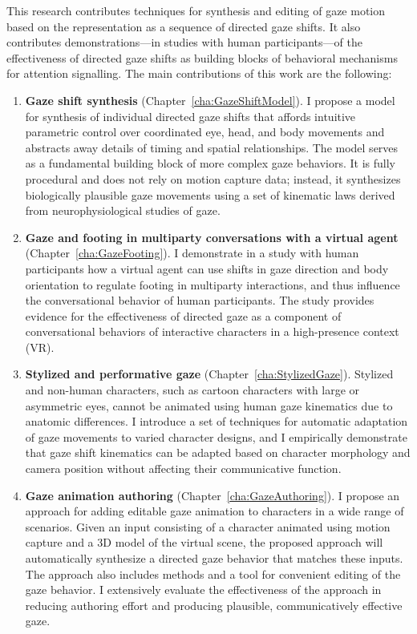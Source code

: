 This research contributes techniques for synthesis and editing of gaze motion based on the representation as a sequence of directed gaze shifts. It also contributes demonstrations---in studies with human participants---of the effectiveness of directed gaze shifts as building blocks of behavioral mechanisms for attention signalling. The main contributions of this work are the following:

\begin{enumerate}
\item \textbf{Gaze shift synthesis} (Chapter~\ref{cha:GazeShiftModel}). I propose a model for synthesis of individual directed gaze shifts that affords intuitive parametric control over coordinated eye, head, and body movements and abstracts away details of timing and spatial relationships. The model serves as a fundamental building block of more complex gaze behaviors. It is fully procedural and does not rely on motion capture data; instead, it synthesizes biologically plausible gaze movements using a set of kinematic laws derived from neurophysiological studies of gaze.
\item \textbf{Gaze and footing in multiparty conversations with a virtual agent} (Chapter~\ref{cha:GazeFooting}). I demonstrate in a study with human participants how a virtual agent can use shifts in gaze direction and body orientation to regulate footing in multiparty interactions, and thus influence the conversational behavior of human participants. The study provides evidence for the effectiveness of directed gaze as a component of conversational behaviors of interactive characters in a high-presence context (VR).
\item \textbf{Stylized and performative gaze} (Chapter~\ref{cha:StylizedGaze}). Stylized and non-human characters, such as cartoon characters with large or asymmetric eyes, cannot be animated using human gaze kinematics due to anatomic differences. I introduce a set of techniques for automatic adaptation of gaze movements to varied character designs, and I empirically demonstrate that gaze shift kinematics can be adapted based on character morphology and camera position without affecting their communicative function.
\item \textbf{Gaze animation authoring} (Chapter~\ref{cha:GazeAuthoring}). I propose an approach for adding editable gaze animation to characters in a wide range of scenarios. Given an input consisting of a character animated using motion capture and a 3D model of the virtual scene, the proposed approach will automatically synthesize a directed gaze behavior that matches these inputs. The approach also includes methods and a tool for convenient editing of the gaze behavior. I extensively evaluate the effectiveness of the approach in reducing authoring effort and producing plausible, communicatively effective gaze.
\end{enumerate}

